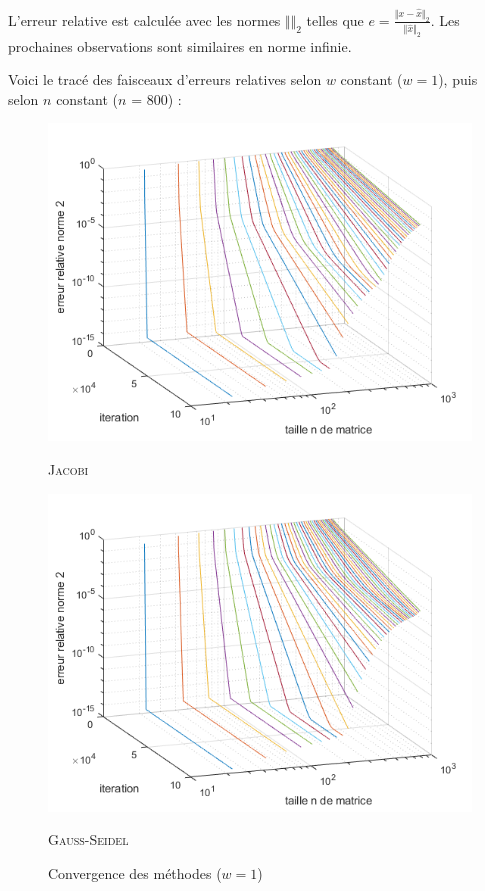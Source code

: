 \documentclass[12pt]{report}
\begin{document}
L'erreur relative est calculée avec les normes $\Vert \Vert_2$ telles que $e = \frac{\Vert x - \hat{x} \Vert_2}{\Vert \hat{x} \Vert_2}$. Les prochaines observations sont similaires en norme infinie.

Voici le tracé des faisceaux d'erreurs relatives selon $w$ constant ($w = 1$), puis selon $n$ constant ($n$ = 800) : 

\begin{figure}[H]
\begin{minipage}{0.5\textwidth}
\includegraphics[scale = 0.63]{j_i_n_2.png}
\caption{\textsc{Jacobi}}
\end{minipage}
\begin{minipage}{0.499\textwidth}
\includegraphics[scale = 0.63]{gs_i_n_2.png}
\caption{ \textsc{Gauss-Seidel}}
\end{minipage}
\caption{Convergence des méthodes  ($w = 1$)}
\end{figure}
\end{document}
